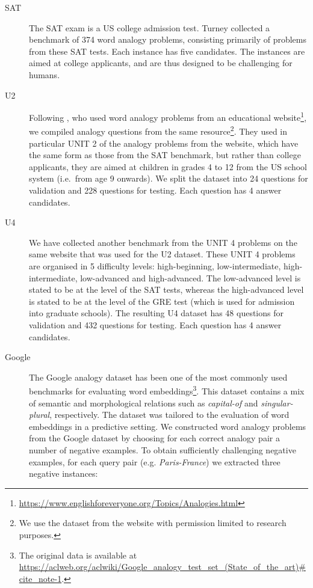 \documentclass[3p]{elsarticle}
\begin{document}
{\begin{description}
\item[SAT] The SAT exam is a US college admission test. Turney \cite{DBLP:conf/ranlp/TurneyLBS03} collected a benchmark of 374 word analogy problems, consisting primarily of problems from these SAT tests. Each instance has five candidates. The instances are aimed at college applicants, and are thus designed to be challenging for humans.
\item[U2] Following \cite{boteanu2015solving}, who used word analogy problems from an educational website\footnote{\url{https://www.englishforeveryone.org/Topics/Analogies.html}}, we compiled analogy questions from the same resource\footnote{We use the dataset from the website with permission limited to research purposes.}. They used in particular UNIT 2 of the analogy problems from the website, which have the same form as those from the SAT benchmark, but rather than college applicants, they are aimed at children in grades 4 to 12 from the US school system (i.e.\ from age 9 onwards). We split the dataset into 24 questions for validation and 228 questions for testing. Each question has 4 answer candidates.
\item[U4] We have collected another benchmark from the UNIT 4 problems on the same website that was used for the U2 dataset. These UNIT 4 problems are organised in 5 difficulty levels: high-beginning, low-intermediate, high-intermediate, low-advanced and high-advanced. The low-advanced level is stated to be at the level of the SAT tests, whereas the high-advanced level is stated to be at the level of the GRE test (which is used for admission into graduate schools). The resulting U4 dataset has 48 questions for validation and 432 questions for testing. Each question has 4 answer candidates.
\item[Google] The Google analogy dataset \cite{mikolov-etal-2013-linguistic} has been one of the most commonly used benchmarks for evaluating word embeddings\footnote{The original data is available at \url{https://aclweb.org/aclwiki/Google_analogy_test_set_(State_of_the_art)\#cite_note-1}.}. This dataset contains a mix of semantic and morphological relations such as \textit{capital-of} and \textit{singular-plural}, respectively. The dataset was tailored to the evaluation of word embeddings in a predictive setting. We constructed word analogy problems from the Google dataset by choosing for each correct analogy pair a number of negative examples. To obtain sufficiently challenging negative examples, for each query pair (e.g. \textit{Paris-France}) we extracted three negative instances: 

\end{description}}
\end{document}
